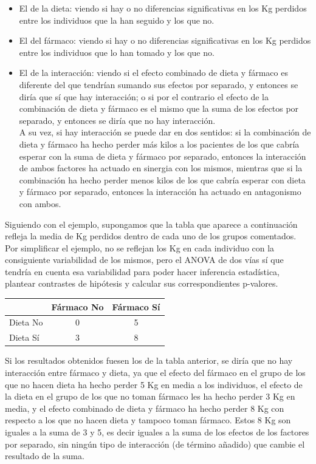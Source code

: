 \documentclass[
  spanish,
  a4paper,
]{scrreport}
\newcounter{none} %
\theoremstyle{plain}
\theoremstyle{definition}
\theoremstyle{definition}
\theoremstyle{remark}
\begin{document}
\begin{itemize}
\item
  El de la dieta: viendo si hay o no diferencias significativas en los
  Kg perdidos entre los individuos que la han seguido y los que no.
\item
  El del fármaco: viendo si hay o no diferencias significativas en los
  Kg perdidos entre los individuos que lo han tomado y los que no.
\item
  El de la interacción: viendo si el efecto combinado de dieta y fármaco
  es diferente del que tendrían sumando sus efectos por separado, y
  entonces se diría que sí que hay interacción; o si por el contrario el
  efecto de la combinación de dieta y fármaco es el mismo que la suma de
  los efectos por separado, y entonces se diría que no hay
  interacción.\\
  A su vez, si hay interacción se puede dar en dos sentidos: si la
  combinación de dieta y fármaco ha hecho perder más kilos a los
  pacientes de los que cabría esperar con la suma de dieta y fármaco por
  separado, entonces la interacción de ambos factores ha actuado en
  sinergia con los mismos, mientras que si la combinación ha hecho
  perder menos kilos de los que cabría esperar con dieta y fármaco por
  separado, entonces la interacción ha actuado en antagonismo con ambos.
\end{itemize}

Siguiendo con el ejemplo, supongamos que la tabla que aparece a
continuación refleja la media de Kg perdidos dentro de cada uno de los
grupos comentados. Por simplificar el ejemplo, no se reflejan los Kg en
cada individuo con la consiguiente variabilidad de los mismos, pero el
ANOVA de dos vías sí que tendría en cuenta esa variabilidad para poder
hacer inferencia estadística, plantear contrastes de hipótesis y
calcular sus correspondientes p-valores.

{\def\LTcaptype{none} %
\begin{longtable}[]{@{}lcc@{}}
\toprule\noalign{}
& Fármaco No & Fármaco Sí \\
\midrule\noalign{}
\endhead
\bottomrule\noalign{}
\endlastfoot
Dieta No & 0 & 5 \\
Dieta Sí & 3 & 8 \\
\end{longtable}
}

Si los resultados obtenidos fuesen los de la tabla anterior, se diría
que no hay interacción entre fármaco y dieta, ya que el efecto del
fármaco en el grupo de los que no hacen dieta ha hecho perder 5 Kg en
media a los individuos, el efecto de la dieta en el grupo de los que no
toman fármaco les ha hecho perder 3 Kg en media, y el efecto combinado
de dieta y fármaco ha hecho perder 8 Kg con respecto a los que no hacen
dieta y tampoco toman fármaco. Estos 8 Kg son iguales a la suma de 3 y
5, es decir iguales a la suma de los efectos de los factores por
separado, sin ningún tipo de interacción (de término añadido) que cambie
el resultado de la suma.
\end{document}
